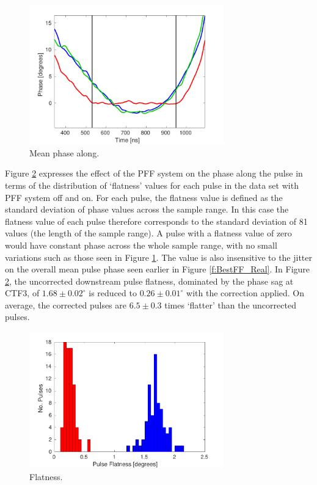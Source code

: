 \begin{figure}
  \centering
  \includegraphics[width=0.75\textwidth]{Figures/feedforward/BestFF_MeanPhaseAlong}
  \caption{Mean phase along.}
  \label{f:BestFF_MeanPhaseAlong}
\end{figure}

Figure \ref{f:BestFF_Flatness} expresses the effect of the PFF system on the phase along the pulse in terms of the distribution of `flatness' values for each pulse in the data set with PFF system off and on. For each pulse, the flatness value is defined as the standard deviation of phase values across the sample range. In this case the flatness value of each pulse therefore corresponds to the standard deviation of 81 values (the length of the sample range). A pulse with a flatness value of zero would have constant phase across the whole sample range, with no small variations such as those seen in Figure \ref{f:BestFF_MeanPhaseAlong}. The value is also insensitive to the jitter on the overall mean pulse phase seen earlier in Figure \ref{f:BestFF_Real}. In Figure \ref{f:BestFF_Flatness}, the uncorrected downstream pulse flatness, dominated by the phase sag at CTF3, of \(1.68\pm0.02^\circ\) is reduced to \(0.26\pm0.01^\circ\) with the correction applied. On average, the corrected pulses are \(6.5\pm0.3\) times `flatter' than the uncorrected pulses.

\begin{figure}
  \centering
  \includegraphics[width=0.75\textwidth]{Figures/feedforward/BestFF_Flatness}
  \caption{Flatness.}
  \label{f:BestFF_Flatness}
\end{figure}

